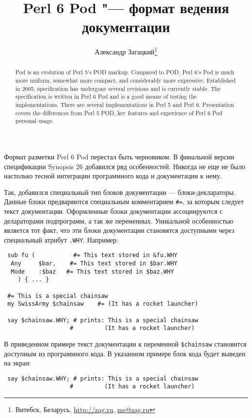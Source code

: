 \documentclass[10pt, a5paper]{article}
\begin{document}
\title{Perl 6 Pod "--- формат ведения документации}
\author{Александр Загацкий\footnote{Витебск, Беларусь, \url{http://zag.ru}, \url{me@zag.ru}}}
\date{}
\maketitle

\begin{abstract}
Pod is an evolution of Perl 5's POD markup. Compared to POD, Perl 6's
Pod is much more
uniform, somewhat more compact, and considerably more
expressive. Established in 2005, specification
has undergone several revisions and is currently stable. The
specification is written in Perl 6 Pod and is a
good means of testing the implementations.
There are several imple\-men\-ta\-tions in Perl 5 and Perl 6.
Presentation covers the differences from Perl 5 POD, key features and 
experience of Perl 6 Pod personal usage.
\end{abstract}

Формат разметки Perl 6 Pod перестал быть черновиком. В финальной версии
спецификации Synopsis 26 \cite{zag1pod} добавился ряд особенностей.
Никогда не еще не было настолько тесной интеграции программного кода и
документации к нему.

Так, добавился специальный тип блоков документации --- блоки-деклараторы.
Данные блоки предваряются специальным комментарием \verb!#=!, за которым
следует текст документации. Оформленные блоки документации ассоциируются
с делараторами подпрограмм, а так же переменных. Уникальной особенностью
является тот факт, что эти блоки документации становятся доступными
через специальный атрибут \verb!.WHY!. Например:

\begin{verbatim}
 sub fu (           #= This text stored in &fu.WHY
  Any     $bar,    #= This text stored in $bar.WHY
  Mode    :$baz   #= This text stored in $baz.WHY
    ) { ... }

 #= This is a special chainsaw
 my SwissArmy $chainsaw    #= (It has a rocket launcher)

 say $chainsaw.WHY; # prints: This is a special chainsaw
                   #         (It has a rocket launcher)
\end{verbatim}


В приведенном примере текст документации к переменной \linebreak \verb!$chainsaw!
становится доступным из программного кода. В указанном примере блок кода
будет выведен на экран:
\begin{verbatim}
 say $chainsaw.WHY; # prints: This is a special chainsaw
                   #         (It has a rocket launcher)
\end{verbatim}
\end{document}
